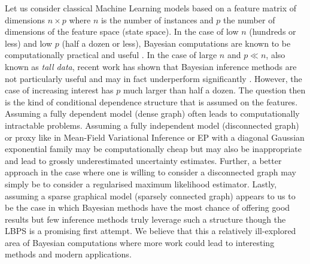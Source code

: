 Let us consider classical Machine Learning models based on a feature matrix of dimensions $n \times p$ where $n$ is the number of instances and $p$ the number of dimensions of the feature space (state space). In the case of low $n$ (hundreds or less) and low $p$ (half a dozen or less), Bayesian computations are known to be computationally practical and useful \citep{gelman13}. In the case of large $n$ and $p\ll n$, also known as \emph{tall data}, recent work has shown that Bayesian inference methods are not particularly useful and may in fact underperform significantly \citep{bardenet17, nagapetyan17}. However, the case of increasing interest has $p$ much larger than half a dozen. The question then is the kind of conditional dependence structure that is assumed on the features. Assuming a fully dependent model (dense graph) often leads to computationally intractable problems. Assuming a fully independent model (disconnected graph) or proxy like in Mean-Field Variational Inference or EP with a diagonal Gaussian exponential family may be computationally cheap but may also be inappropriate and lead to grossly underestimated uncertainty estimates.  Further, a better approach in the case where one is willing to consider a disconnected graph may simply be to consider a regularised maximum likelihood estimator. Lastly, assuming a sparse graphical model (sparsely connected graph) appears to us to be the case in which Bayesian methods have the most chance of offering good results but few inference methods truly leverage such a structure though the LBPS is a promising first attempt. We believe that this a relatively ill-explored area of Bayesian computations where more work could lead to interesting methods and modern applications.
